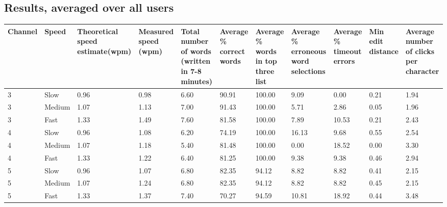 \documentclass[10pt,fleqn,a4paper]{article}
\begin{document}
\subsection{Results, averaged over all users}
{\small 
\begin{tabular}{|p{1cm}|p{1.0cm}|p{1.5cm}|p{1.2cm}|p{1.2cm}|p{1.2cm}|p{1.2cm}|p{1.2cm}|p{1.2cm}|p{1.2cm}|p{1.2cm}|} \hline

{\bf Channel} & {\bf Speed} & {\bf Theoretical speed estimate(wpm)} & {\bf Measured speed (wpm)} & {\bf Total number of words (written in 7-8 minutes)} & {\bf Average \% correct words} & {\bf Average \% words in top three list}  & {\bf Average \% erroneous word selections} & {\bf Average \% timeout errors} & {\bf Min edit distance} & {\bf Average number of clicks per character}  \\ \hline

3 & Slow & 0.96 & 0.98 & 6.60 & 90.91 & 100.00 & 9.09 & 0.00 & 0.21 & 1.94 \\ \hline
3 & Medium & 1.07 & 1.13 & 7.00 & 91.43 & 100.00 & 5.71 & 2.86 & 0.05 & 1.96 \\ \hline
3 & Fast & 1.33 & 1.49 & 7.60 & 81.58 & 100.00 & 7.89 & 10.53 & 0.21 & 2.43 \\ \hline
4 & Slow & 0.96 & 1.08 & 6.20 & 74.19 & 100.00 & 16.13 & 9.68 & 0.55 & 2.54 \\ \hline
4 & Medium & 1.07 & 1.18 & 5.40 & 81.48 & 100.00 & 0.00 & 18.52 & 0.00 & 3.30 \\ \hline
4 & Fast & 1.33 & 1.22 & 6.40 & 81.25 & 100.00 & 9.38 & 9.38 & 0.46 & 2.94 \\ \hline
5 & Slow & 0.96 & 1.07 & 6.80 & 82.35 & 94.12 & 8.82 & 8.82 & 0.41 & 2.15 \\ \hline
5 & Medium & 1.07 & 1.24 & 6.80 & 82.35 & 94.12 & 8.82 & 8.82 & 0.45 & 2.15 \\ \hline
5 & Fast & 1.33 & 1.37 & 7.40 & 70.27 & 94.59 & 10.81 & 18.92 & 0.44 & 3.48 \\ \hline

\end{tabular}
 }
\end{document}
